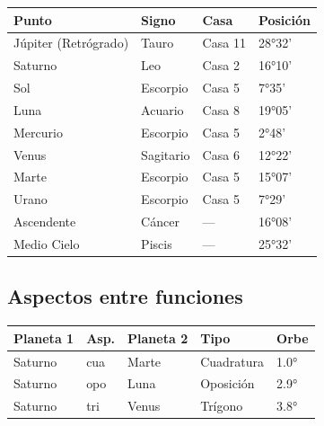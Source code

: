 \documentclass[11pt,a4paper]{article}
\begin{document}
\begin{center}
\begin{tabular}{llll}
\toprule
\textbf{Punto} & \textbf{Signo} & \textbf{Casa} & \textbf{Posición} \\
\midrule

Júpiter (Retrógrado) &
Tauro &
Casa 11 &
28°32' \\

Saturno &
Leo &
Casa 2 &
16°10' \\

Sol &
Escorpio &
Casa 5 &
7°35' \\

Luna &
Acuario &
Casa 8 &
19°05' \\

Mercurio &
Escorpio &
Casa 5 &
2°48' \\

Venus &
Sagitario &
Casa 6 &
12°22' \\

Marte &
Escorpio &
Casa 5 &
15°07' \\

Urano &
Escorpio &
Casa 5 &
7°29' \\

Ascendente &
Cáncer &
--- &
16°08' \\

Medio Cielo &
Piscis &
--- &
25°32' \\

\bottomrule
\end{tabular}
\end{center}

\vspace{0.8cm}

\subsection*{Aspectos entre funciones}

\begin{center}
\begin{tabular}{lllll}
  \toprule
  \textbf{Planeta 1} & \textbf{Asp.} & \textbf{Planeta 2} & \textbf{Tipo} & \textbf{Orbe} \\
  \midrule
  Saturno & cua & Marte & Cuadratura & 1.0° \\
  Saturno & opo & Luna & Oposición & 2.9° \\
  Saturno & tri & Venus & Trígono & 3.8° \\
  \bottomrule
\end{tabular}
\end{center}
\end{document}
